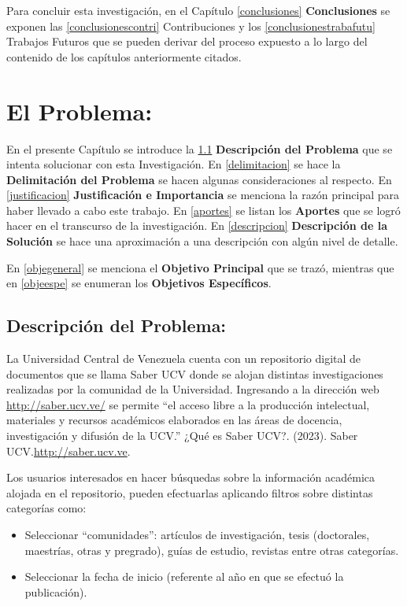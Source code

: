 \documentclass[
  10,
  openany]{book}
\begin{document}
Para concluir esta investigación, en el Capítulo \ref{conclusiones} \textbf{Conclusiones} se exponen las \ref{conclusionescontri} Contribuciones y los \ref{conclusionestrabafutu} Trabajos Futuros que se pueden derivar del proceso expuesto a lo largo del contenido de los capítulos anteriormente citados.

\hypertarget{capproblema}{%
\chapter{El Problema:}\label{capproblema}}

En el presente Capítulo se introduce la \ref{desproblema} \textbf{Descripción del Problema} que se intenta solucionar con esta Investigación. En \ref{delimitacion} se hace la \textbf{Delimitación del Problema} se hacen algunas consideraciones al respecto. En \ref{justificacion} \textbf{Justificación e Importancia} se menciona la razón principal para haber llevado a cabo este trabajo. En \ref{aportes} se listan los \textbf{Aportes} que se logró hacer en el transcurso de la investigación. En \ref{descripcion} \textbf{Descripción de la Solución} se hace una aproximación a una descripción con algún nivel de detalle.

En \ref{objegeneral} se menciona el \textbf{Objetivo Principal} que se trazó, mientras que en \ref{objeespe} se enumeran los \textbf{Objetivos Específicos}.

\hypertarget{desproblema}{%
\section{Descripción del Problema:}\label{desproblema}}

La Universidad Central de Venezuela cuenta con un repositorio digital de documentos que se llama Saber UCV donde se alojan distintas investigaciones realizadas por la comunidad de la Universidad. Ingresando a la dirección web \url{http://saber.ucv.ve/} se permite ``el acceso libre a la producción intelectual, materiales y recursos académicos elaborados en las áreas de docencia, investigación y difusión de la UCV.'' ¿Qué es Saber UCV?. (2023). Saber UCV.\href{http://saber.ucv.ve/}{http://saber.ucv.ve}.

Los usuarios interesados en hacer búsquedas sobre la información académica alojada en el repositorio, pueden efectuarlas aplicando filtros sobre distintas categorías como:

\begin{itemize}
\item
  Seleccionar ``comunidades'': artículos de investigación, tesis (doctorales, maestrías, otras y pregrado), guías de estudio, revistas entre otras categorías.
\item
  Seleccionar la fecha de inicio (referente al año en que se efectuó la publicación).
\end{itemize}
\end{document}
